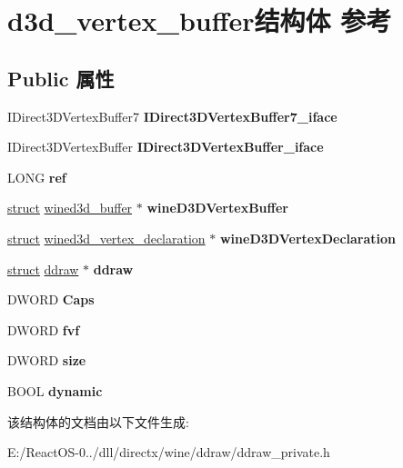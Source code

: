 \hypertarget{structd3d__vertex__buffer}{}\section{d3d\+\_\+vertex\+\_\+buffer结构体 参考}
\label{structd3d__vertex__buffer}
\subsection*{Public 属性}
\begin{DoxyCompactItemize}
\item 
\mbox{\label{structd3d__vertex__buffer_ac23be65fe633337457f1f61d8a738d98}} 
I\+Direct3\+D\+Vertex\+Buffer7 {\bfseries I\+Direct3\+D\+Vertex\+Buffer7\+\_\+iface}
\item 
\mbox{\label{structd3d__vertex__buffer_af961f660763163904c3582bbeb57f3a5}} 
I\+Direct3\+D\+Vertex\+Buffer {\bfseries I\+Direct3\+D\+Vertex\+Buffer\+\_\+iface}
\item 
\mbox{\label{structd3d__vertex__buffer_ae08fe166e05af5f5bb6a5fb7bcb26013}} 
L\+O\+NG {\bfseries ref}
\item 
\mbox{\label{structd3d__vertex__buffer_a96ee13c18de06eccab38f9dacfd0d6bd}} 
\hyperlink{interfacestruct}{struct} \hyperlink{structwined3d__buffer}{wined3d\+\_\+buffer} $\ast$ {\bfseries wine\+D3\+D\+Vertex\+Buffer}
\item 
\mbox{\label{structd3d__vertex__buffer_adab15dac752ad6d60e6c6eb2644feb04}} 
\hyperlink{interfacestruct}{struct} \hyperlink{structwined3d__vertex__declaration}{wined3d\+\_\+vertex\+\_\+declaration} $\ast$ {\bfseries wine\+D3\+D\+Vertex\+Declaration}
\item 
\mbox{\label{structd3d__vertex__buffer_a206d9955466c0004877ba78ccfe0095d}} 
\hyperlink{interfacestruct}{struct} \hyperlink{structddraw}{ddraw} $\ast$ {\bfseries ddraw}
\item 
\mbox{\label{structd3d__vertex__buffer_a0f2e7aef0b62c2c579467d51bbef8424}} 
D\+W\+O\+RD {\bfseries Caps}
\item 
\mbox{\label{structd3d__vertex__buffer_a6997ba622e6f865bb235d21cb173b57b}} 
D\+W\+O\+RD {\bfseries fvf}
\item 
\mbox{\label{structd3d__vertex__buffer_abb36e50d9b0f6ceef3bef1210152e8bf}} 
D\+W\+O\+RD {\bfseries size}
\item 
\mbox{\label{structd3d__vertex__buffer_a2587b1db271f516246883867de0b1201}} 
B\+O\+OL {\bfseries dynamic}
\end{DoxyCompactItemize}


该结构体的文档由以下文件生成\+:\begin{DoxyCompactItemize}
\item 
E\+:/\+React\+O\+S-\/0../dll/directx/wine/ddraw/ddraw\+\_\+private.\+h\end{DoxyCompactItemize}
